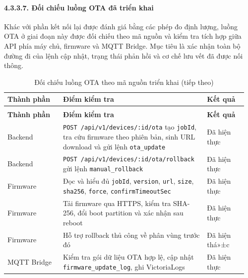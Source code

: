 \documentclass[a4paper]{extarticle}
\newcommand{\thesissettableid}[2]{%
  \renewcommand{\thetable}{#1}%
  \renewcommand{\theHtable}{#2}%
}
\begin{document}
\paragraph{4.3.3.7. Đối chiếu luồng OTA đã triển
khai}\label{4337-ux111ux1ed1i-chiux1ebfu-luux1ed3ng-ota-ux111uxe3-triux1ec3n-khai}

Khác với phần kết nối lại được đánh giá bằng các phép đo định lượng, luồng
OTA ở giai đoạn này được đối chiếu theo mã nguồn và kiểm tra tích hợp
giữa API phía máy chủ, firmware và MQTT Bridge. Mục tiêu là xác nhận toàn bộ
đường đi của lệnh cập nhật, trạng thái phản hồi và cơ chế lưu vết đã
được nối thông.


{\thesissettableid{4.25A}{tab-ch4-oi-chieu-luong-ota-theo-ma-nguon-trien-khai}
\def\LTcaptype{table}
\begin{longtable}{|L{0.224\linewidth}|L{0.580\linewidth}|L{0.160\linewidth}|}
\caption{Đối chiếu luồng OTA theo mã nguồn triển khai}\label{tab:ch4-oi-chieu-luong-ota-theo-ma-nguon-trien-khai}\\
\hline \textbf{Thành phần} & \textbf{Điểm kiểm tra} & \textbf{Kết quả} \\
\hline
\endfirsthead
\caption[]{Đối chiếu luồng OTA theo mã nguồn triển khai (tiếp theo)}\\
\hline \textbf{Thành phần} & \textbf{Điểm kiểm tra} & \textbf{Kết quả} \\
\hline
\endhead
\hline
\endfoot
\endlastfoot
Backend & \nolinkurl{POST /api/v1/devices/:id/ota} tạo \texttt{jobId}, tra
cứu firmware theo phiên bản, sinh URL download và gửi lệnh
\texttt{ota\_update} & Đã hiện thực \\\hline
Backend & \nolinkurl{POST /api/v1/devices/:id/ota/rollback} gửi lệnh
\texttt{manual\_rollback} & Đã hiện thực \\\hline
Firmware & Đọc và hiểu đủ \texttt{jobId}, \texttt{version}, \texttt{url},
\texttt{size}, \texttt{sha256}, \texttt{force},
\texttt{confirmTimeoutSec} & Đã hiện thực \\\hline
Firmware & Tải firmware qua HTTPS, kiểm tra SHA-256, đổi boot partition
và xác nhận sau reboot & Đã hiện thực \\\hline
Firmware & Hỗ trợ rollback thủ công về phân vùng trước đó & Đã hiện
thá»±c \\\hline
MQTT Bridge & Kiểm tra gói dữ liệu OTA hợp lệ, cập nhật
\texttt{firmware\_update\_log}, ghi VictoriaLogs & Đã hiện thực \\\hline
\end{longtable}
}
\end{document}
